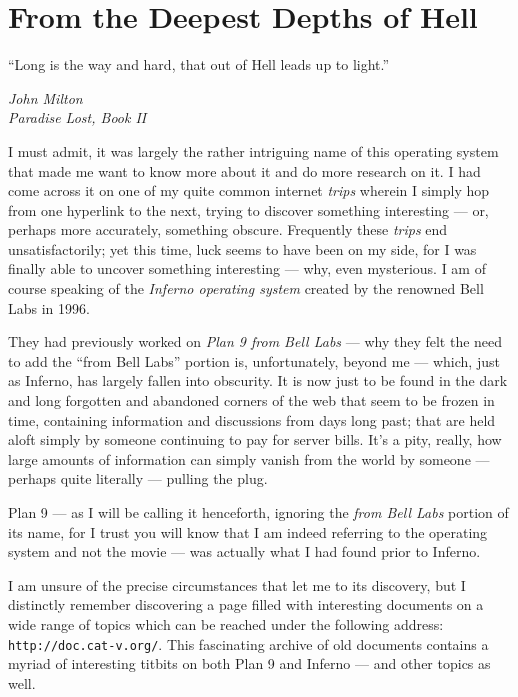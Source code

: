 \documentclass[a5paper,twoside,12pt]{report}
\begin{document}
\chapter*{From the Deepest Depths of Hell}

\epigraph{``Long is the way and hard, that out of Hell leads up to light.''}{\textit{John Milton\\Paradise Lost, Book II}}

I must admit, it was largely the rather intriguing name of this operating system that made me want to know more about it and do more research on it. I had come across it on one of my quite common internet \textit{trips} wherein I simply hop from one hyperlink to the next, trying to discover something interesting — or, perhaps more accurately, something obscure. 
Frequently these \textit{trips} end unsatisfactorily; yet this time, luck seems to have been on my side, for I was finally able to uncover something interesting — why, even mysterious. I am of course speaking of the \textit{Inferno operating system} created by the renowned Bell Labs in 1996. 

They had previously worked on \textit{Plan 9 from Bell Labs} — why they felt the need to add the ``from Bell Labs'' portion is, unfortunately, beyond me — which, just as Inferno, has largely fallen into obscurity. It is now just to be found in the dark and long forgotten and abandoned corners of the web that seem to be frozen in time, containing information and discussions from days long past; that are held aloft simply by someone continuing to pay for server bills. It's a pity, really, how large amounts of information can simply vanish from the world by someone — perhaps quite literally — pulling the plug.

Plan 9 — as I will be calling it henceforth, ignoring the \textit{from Bell Labs} portion of its name, for I trust you will know that I am indeed referring to the operating system and not the movie — was actually what I had found prior to Inferno.

I am unsure of the precise circumstances that let me to its discovery, but I distinctly remember discovering a page filled with interesting documents on a wide range of topics which can be reached under the following address: \texttt{http://doc.cat-v.org/}. 
This fascinating archive of old documents contains a myriad of interesting titbits on both Plan 9 and Inferno — and other topics as well. 
\end{document}
